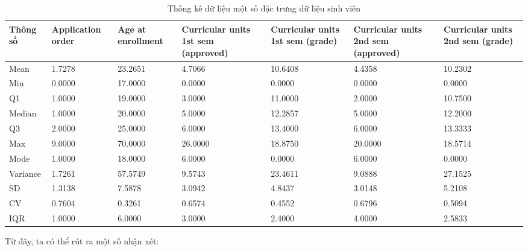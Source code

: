     \begin{table}[htbp]
    \centering
    \caption{ Thống kê dữ liệu một số đặc trưng dữ liệu sinh viên}
    \label{tab:stat-dropout}
    \begin{tabular}{|p{2cm}|p{2cm}|p{2cm}|p{2cm}|p{2cm}|p{2cm}|p{2cm}|}
        \hline
        Thông số & Application order & Age at enrollment & Curricular units 1st sem (approved) & Curricular units 1st sem (grade) & Curricular units 2nd sem (approved) & Curricular units 2nd sem (grade) \\
        \hline
        Mean & 1.7278 & 23.2651 & 4.7066 & 10.6408 & 4.4358 & 10.2302 \\
        Min & 0.0000 & 17.0000 & 0.0000 & 0.0000 & 0.0000 & 0.0000 \\
        Q1 & 1.0000 & 19.0000 & 3.0000 & 11.0000 & 2.0000 & 10.7500 \\
        Median & 1.0000 & 20.0000 & 5.0000 & 12.2857 & 5.0000 & 12.2000 \\
        Q3 & 2.0000 & 25.0000 & 6.0000 & 13.4000 & 6.0000 & 13.3333 \\
        Max & 9.0000 & 70.0000 & 26.0000 & 18.8750 & 20.0000 & 18.5714 \\
        Mode & 1.0000 & 18.0000 & 6.0000 & 0.0000 & 6.0000 & 0.0000 \\
        Variance & 1.7261 & 57.5749 & 9.5743 & 23.4611 & 9.0888 & 27.1525 \\
        SD & 1.3138 & 7.5878 & 3.0942 & 4.8437 & 3.0148 & 5.2108 \\
        CV & 0.7604 & 0.3261 & 0.6574 & 0.4552 & 0.6796 & 0.5094 \\
        IQR & 1.0000 & 6.0000 & 3.0000 & 2.4000 & 4.0000 & 2.5833 \\
        \hline
    \end{tabular}
    \end{table}

    Từ đây, ta có thể rút ra một số nhận xét:

